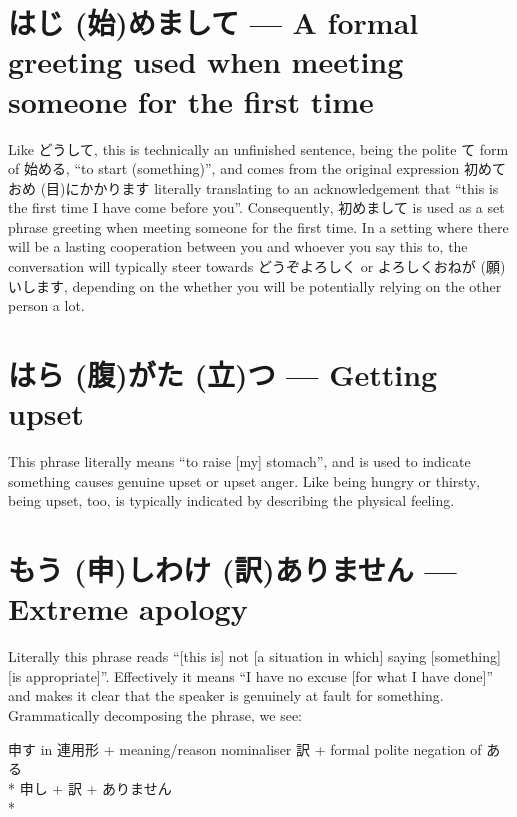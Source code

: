\documentclass[11pt, b5paper, twoside, openright, onecolumn]{book}
\makeatletter
\newcommand*{\rubystack}[2]{{\relscale{0.5}%
  \begin{tabular}[b]{@{}c@{}}%
    {#1}\\%
   {\textscale{2}{#2}}%
  \end{tabular}}%
}
\DeclareRobustCommand*{\ruby}[2]{%
  \mbox{%
    \setlength{\parskip}{0ex}%
    \BeginAccSupp{method=pdfstringdef,ActualText={#1}}%
      \rubystack{\phantom{#2}}{#1}%
      \llap{%
        \rubystack{#2}{\phantom{#1}}%
      }%
    \EndAccSupp{}%
  }%
}
\renewcommand*{\ruby}[2]{#2 (#1)}%
\newenvironment{exampleblock}{
\setlength{\parindent}{0.6in}
\begin{minipage}[t]{\dimexpr\textwidth-\parindent}}
{\end{minipage}}
\makeatother
\begin{document}
\section*{\ruby{始}{はじ}めまして — A formal greeting used when meeting someone for the first time}

Like どうして‚ this is technically an unfinished sentence‚ being the polite て form of 始める‚ “to start (something)”‚ and comes from the original expression 初めてお\ruby{目}{め}にかかります literally translating to an acknowledgement that “this is the first time I have come before you”. Consequently‚ 初めまして is used as a set phrase greeting when meeting someone for the first time. In a setting where there will be a lasting cooperation between you and whoever you say this to‚ the conversation will typically steer towards どうぞよろしく or よろしくお\ruby{願}{ねが}いします‚ depending on the whether you will be potentially relying on the other person a lot.

\section*{\ruby{腹}{はら}が\ruby{立}{た}つ — Getting upset}

This phrase literally means “to raise [my] stomach”‚ and is used to indicate something causes genuine upset or upset anger. Like being hungry or thirsty‚ being upset‚ too‚ is typically indicated by describing the physical feeling.

\section*{\ruby{申}{もう}し\ruby{訳}{わけ}ありません — Extreme apology}

Literally this phrase reads “[this is] not [a situation in which] saying [something] [is appropriate]”. Effectively it means “I have no excuse [for what I have done]” and makes it clear that the speaker is genuinely at fault for something. Grammatically decomposing the phrase‚ we see:

\vspace{0.4cm}
\begin{exampleblock}
申す in 連用形 + meaning/reason nominaliser 訳 + formal polite negation of ある \\* 
申し + 訳 + ありません \\* 
\end{exampleblock}
\vspace{0.2cm}
\end{document}
